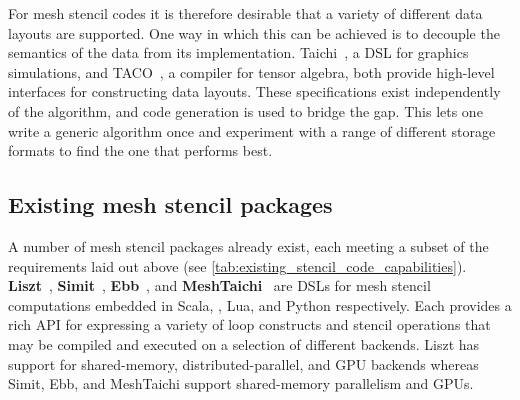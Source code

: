 \documentclass[thesis]{subfiles}
\begin{document}
For mesh stencil codes it is therefore desirable that a variety of different data layouts are supported.
One way in which this can be achieved is to decouple the semantics of the data from its implementation.
Taichi~\cite{huTaichiLanguageHighperformance2019}, a DSL for graphics simulations, and TACO~\cite{kjolstadTacoToolGenerate2017}, a compiler for tensor algebra, both provide high-level interfaces for constructing data layouts.
These specifications exist independently of the algorithm, and code generation is used to bridge the gap.
This lets one write a generic algorithm once and experiment with a range of different storage formats to find the one that performs best.

\subsection{Existing mesh stencil packages}
\label{sec:intro_existing_software}

A number of mesh stencil packages already exist, each meeting a subset of the requirements laid out above (see \cref{tab:existing_stencil_code_capabilities}).
\textbf{Liszt}~\cite{devitoLisztDomainSpecific2011}, \textbf{Simit}~\cite{kjolstadSimitLanguagePhysical2016}, \textbf{Ebb}~\cite{bernsteinEbbDSLPhysical2016}, and \textbf{MeshTaichi}~\cite{yuMeshTaichiCompilerEfficient2022} are DSLs for mesh stencil computations embedded in Scala, \cplusplus{}, Lua, and Python respectively.
Each provides a rich API for expressing a variety of loop constructs and stencil operations that may be compiled and executed on a selection of different backends.
Liszt has support for shared-memory, distributed-parallel, and GPU backends whereas Simit, Ebb, and MeshTaichi support shared-memory parallelism and GPUs.
\end{document}
